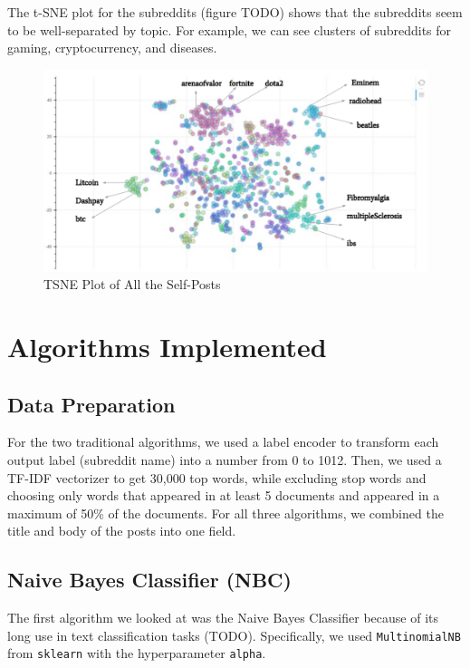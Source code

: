 \documentclass{sig-alternate-05-2015}
\begin{document}
The t-SNE plot for the subreddits (figure TODO) shows that the subreddits seem to be well-separated by topic. For example, we can see clusters of subreddits for gaming, cryptocurrency, and diseases.


\begin{figure}[H]
\centering
\includegraphics[width=\linewidth]{plots/tsne.png}
\caption{TSNE Plot of All the Self-Posts}
\end{figure}

\section{Algorithms Implemented}

\subsection{Data Preparation}

For the two traditional algorithms, we used a label encoder to transform each output label (subreddit name) into a number from 0 to 1012. Then, we used a TF-IDF vectorizer to get 30,000 top words, while excluding stop words and choosing only words that appeared in at least 5 documents and appeared in a maximum of 50\% of the documents. For all three algorithms, we combined the title and body of the posts into one field.

\subsection{Naive Bayes Classifier (NBC)}

The first algorithm we looked at was the Naive Bayes Classifier because of its long use in text classification tasks (TODO). Specifically, we used \verb+MultinomialNB+ from \verb+sklearn+ with the hyperparameter \verb+alpha+.
\end{document}
